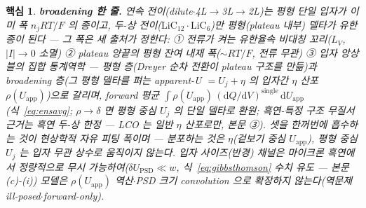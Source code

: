 \documentclass[11pt,a4paper]{article}
\newtheorem*{keybox}{핵심}
\newcommand{\dd}{\mathrm{d}}
\newcommand{\app}{\mathrm{app}}
\begin{document}
\begin{keybox}
\textbf{broadening 한 줄.} 연속 전이(dilute$\cdot$4L$\to$3L$\to$2L)는 평형 단일 입자가 \emph{이미} 폭 $n_jRT/F$ 의 종이고,
두-상 전이($\mathrm{LiC_{12}}\cdot\mathrm{LiC_6}$)만 평형(plateau 내부) 델타가 유한 종이 된다 — 그 폭은 \emph{세}
출처가 정한다: ① \emph{전류가 켜는} 유한율속 비대칭 꼬리($L_V$, $|I|\!\to\!0$ 소멸) ② plateau 양끝의 \emph{평형 잔여}
내재 폭($\sim RT/F$, 전류 무관) ③ \emph{입자 앙상블}의 집합 통계역학 — 평형 층(Dreyer 순차 전환이 \emph{plateau 구조}를
만듦)과 broadening 층(그 평형 델타를 펴는 \emph{apparent-U $=U_j+\eta$} 의 입자간 $\eta$ 산포 $\rho(U_\app)$)으로 갈리며,
forward 평균 $\int\rho(U_\app)\,(\dd Q/\dd V)^\mathrm{single}\,\dd U_\app$(식~\eqref{eq:ensavg}; $\rho\!\to\!\delta$ 면
평형 중심 $U_j$ 의 단일 델타로 환원; 흑연-특정 구조 무질서 \emph{근거}는 흑연 두-상 한정 — LCO 는 일반
$\eta$ 산포로만, 본문 ③). 셋을 한꺼번에 흡수하는 것이 \emph{현상학적 자유 피팅 폭}이며 —
\emph{분포하는 것은 $\eta$(겉보기 중심 $U_\app$), 평형 중심 $U_j$ 는 입자 무관 상수로 움직이지 않는다}. 입자
사이즈(반경) 채널은 마이크론 흑연에서 정량적으로 무시 가능하여($\delta U_\mathrm{PSD}\ll w$,
식~\eqref{eq:gibbsthomson} 수치 유도 — 본문 (c)-(i)) 모델은 $\rho(U_\app)$ 역산$\cdot$PSD 크기 convolution
으로 확장하지 않는다(역문제 ill-posed$\cdot$forward-only).
\end{keybox}
\end{document}
